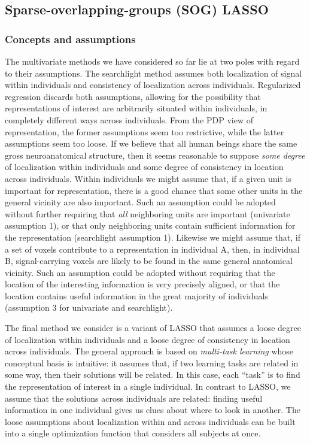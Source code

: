 \subsection{Sparse-overlapping-groups (SOG) LASSO}
\subsubsection{Concepts and assumptions}
The multivariate methods we have considered so far lie at two poles with regard to their assumptions. The searchlight method assumes both localization of signal within individuals and consistency of localization across individuals. Regularized regression discards both assumptions, allowing for the possibility that representations of interest are arbitrarily situated within individuals, in completely different ways across individuals. From the PDP view of representation, the former assumptions seem too restrictive, while the latter assumptions seem too loose. If we believe that all human beings share the same gross neuroanatomical structure, then it seems reasonable to suppose {\em some degree} of localization within individuals and some degree of consistency in location across individuals. Within individuals we might assume that, if a given unit is important for representation, there is a good chance that some other units in the general vicinity are also important. Such an assumption could be adopted without further requiring that {\em all} neighboring units are important (univariate assumption 1), or that only neighboring units contain sufficient information for the representation (searchlight assumption 1). Likewise we might assume that, if a set of voxels contribute to a representation in individual A, then, in individual B, signal-carrying voxels are likely to be found in the same general anatomical vicinity. Such an assumption could be adopted without requiring that the location of the interesting information is very precisely aligned, or that the location contains useful information in the great majority of individuals (assumption 3 for univariate and searchlight).

The final method we consider is a variant of LASSO that assumes a loose degree of localization within individuals and a loose degree of consistency in location across individuals. The general approach is based on {\em multi-task learning} \cite{Caruana97} whose conceptual basis is intuitive: it assumes that, if two learning tasks are related in some way, then their solutions will be related. In this case, each ``task'' is to find the representation of interest in a single individual. In contrast to LASSO, we assume that the solutions across individuals are related: finding useful information in one individual gives us clues about where to look in another. The loose assumptions about localization within and across individuals can be built into a single optimization function that considers all subjects at once.

